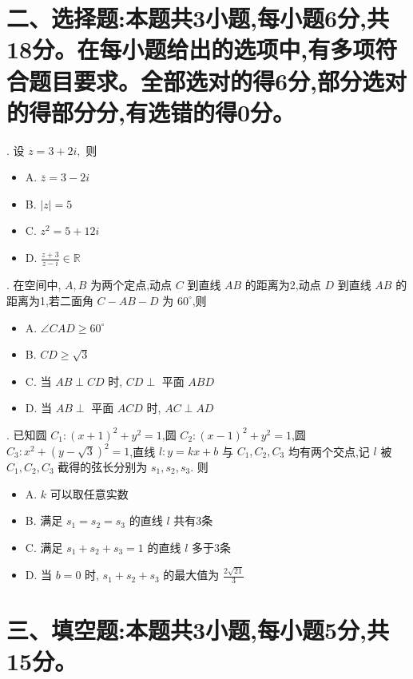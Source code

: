 \documentclass[UTF8, a4paper, 11pt]{ctexart}
\begin{document}
\vspace{1em}

\section*{二、选择题:本题共3小题,每小题6分,共18分。在每小题给出的选项中,有多项符合题目要求。全部选对的得6分,部分选对的得部分分,有选错的得0分。}

. 设 $z=3+2i,$ 则
\begin{itemize}
    \item A. $\overline{z}=3-2i$
    \item B. $|z|=5$
    \item C. $z^{2}=5+12i$
    \item D. $\frac{z+3}{z-i}\in\mathbb{R}$
\end{itemize}

. 在空间中, $A,B$ 为两个定点,动点 $C$ 到直线 $AB$ 的距离为2,动点 $D$ 到直线 $AB$ 的距离为1,若二面角 $C-AB-D$ 为 $60^{\circ}$,则
\begin{itemize}
    \item A. $\angle CAD\ge60^{\circ}$
    \item B. $CD\ge\sqrt{3}$
    \item C. 当 $AB\perp CD$ 时, $CD\perp$ 平面 $ABD$
    \item D. 当 $AB\perp$ 平面 $ACD$ 时, $AC\perp AD$
\end{itemize}

. 已知圆 $C_{1}:(x+1)^{2}+y^{2}=1$,圆 $C_{2}:(x-1)^{2}+y^{2}=1$,圆 $C_{3}:x^{2}+(y-\sqrt{3})^{2}=1$,直线 $l:y=kx+b$ 与 $C_{1},C_{2},C_{3}$ 均有两个交点,记 $l$ 被 $C_{1},C_{2},C_{3}$ 截得的弦长分别为 $s_{1},s_{2},s_{3}.$ 则
\begin{itemize}
    \item A. $k$ 可以取任意实数
    \item B. 满足 $s_{1}=s_{2}=s_{3}$ 的直线 $l$ 共有3条
    \item C. 满足 $s_{1}+s_{2}+s_{3}=1$ 的直线 $l$ 多于3条
    \item D. 当 $b=0$ 时, $s_{1}+s_{2}+s_{3}$ 的最大值为 $\frac{2\sqrt{21}}{3}$
\end{itemize}

\vspace{1em}

\section*{三、填空题:本题共3小题,每小题5分,共15分。}
\end{document}
